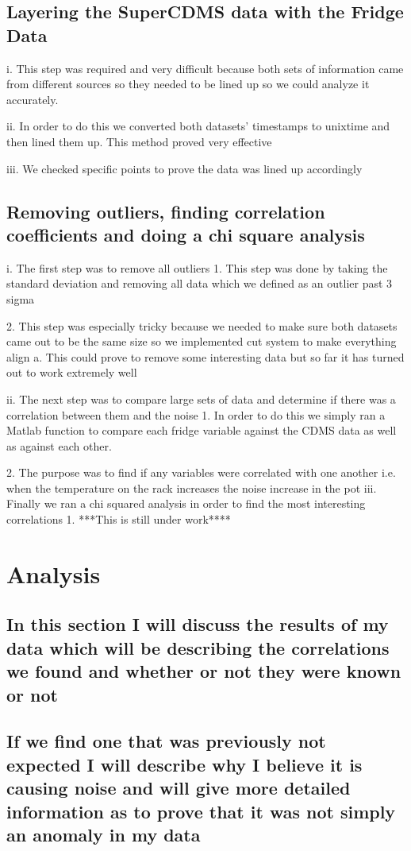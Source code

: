 \subsection{Layering the SuperCDMS data with the Fridge Data}
i.	This step was required and very difficult because both sets of information came from different sources so they needed to be lined up so we could analyze it accurately. 

ii.	In order to do this we converted both datasets’ timestamps to unixtime and then lined them up. This method proved very effective

iii.	We checked specific points to prove the data was lined up accordingly

\subsection{Removing outliers, finding correlation coefficients and doing a chi square analysis}
i.	The first step was to remove all outliers
1.	This step was done by taking the standard deviation and removing all data which we defined as an outlier past 3 sigma

2.	This step was especially tricky because we needed to make sure both datasets came out to be the same size so we implemented cut system to make everything align
a.	This could prove to remove some interesting data but so far it has turned out to work extremely well

ii.	The next step was to compare large sets of data and determine if there was a correlation between them and the noise
1.	In order to do this we simply ran a Matlab function to compare each fridge variable against the CDMS data as well as against each other.

2.	The purpose was to find if any variables were correlated with one another i.e. when the temperature on the rack increases the noise increase in the pot
iii.	Finally we ran a chi squared analysis in order to find the most interesting correlations
1.	***This is still under work****
\section{Analysis}
\subsection{In this section I will discuss the results of my data which will be describing the correlations we found and whether or not they were known or not}
\subsection{If we find one that was previously not expected I will describe why I believe it is causing noise and will give more detailed information as to prove that it was not simply an anomaly in my data}
